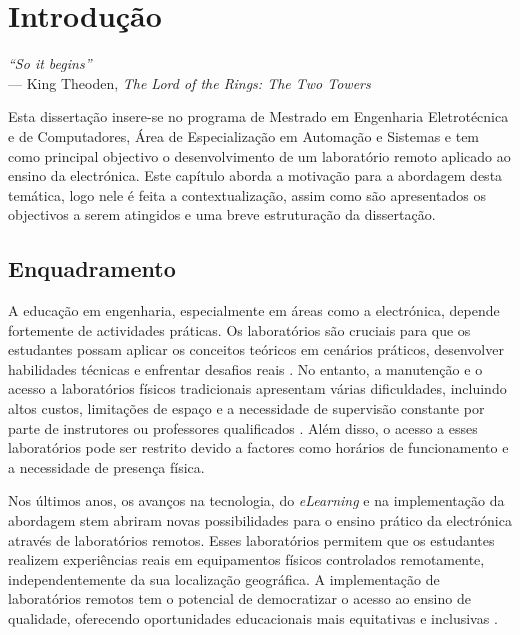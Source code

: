 
\chapter{Introdução} 	%
\label{Capítulo1} 		%

\begin{flushright}
\textit{``So it begins''} \\[0.5em]
--- King Theoden, \textit{The Lord of the Rings: The Two Towers}
\end{flushright}
Esta dissertação insere-se no programa de Mestrado em Engenharia Eletrotécnica e de Computadores, Área de Especialização em Automação e Sistemas e tem como principal objectivo o desenvolvimento de um laboratório remoto aplicado ao ensino da electrónica.
Este capítulo aborda a motivação para a abordagem desta temática, logo nele é feita a contextualização, assim como são apresentados os objectivos a serem atingidos e uma breve estruturação da dissertação.

\section{Enquadramento}
\label{sec: Enquadramento}
A educação em engenharia, especialmente em áreas como a electrónica, depende fortemente de actividades práticas. Os laboratórios são cruciais para que os estudantes possam aplicar os conceitos teóricos em cenários práticos, desenvolver habilidades técnicas e enfrentar desafios reais \cite{Hofstein, BRINSON2015218}. No entanto, a manutenção e o acesso a laboratórios físicos tradicionais apresentam várias dificuldades, incluindo altos custos, limitações de espaço e a necessidade de supervisão constante por parte de instrutores ou professores qualificados \cite{feisel}. Além disso, o acesso a esses laboratórios pode ser restrito devido a factores como horários de funcionamento e a necessidade de presença física.

Nos últimos anos, os avanços na tecnologia, do \textit{eLearning} e na implementação da abordagem \acrfull{stem} abriram novas possibilidades para o ensino prático da electrónica através de laboratórios remotos. Esses laboratórios permitem que os estudantes realizem experiências reais em equipamentos físicos controlados remotamente, independentemente da sua localização geográfica. A implementação de laboratórios remotos tem o potencial de democratizar o acesso ao ensino de qualidade, oferecendo oportunidades educacionais mais equitativas e inclusivas \cite{CORTER20112054}.

